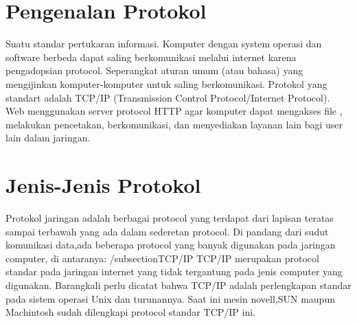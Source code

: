 

\section{Pengenalan Protokol} 
 Suatu standar pertukaran informasi. Komputer dengan system operasi dan software berbeda dapat saling berkomunikasi melalui internet 
 karena pengadopsian protocol. Seperangkat aturan umum (atau bahasa) yang mengijinkan komputer-komputer untuk saling berkomunikasi. 
 Protokol yang standart adalah TCP/IP (Transmission Control Protocol/Internet Protocol). Web menggunakan server protocol HTTP agar 
 komputer dapat mengakses file , melakukan pencetakan, berkomunikasi, dan menyediakan layanan lain bagi user lain dalam jaringan. 

\section{Jenis-Jenis Protokol}
Protokol jaringan adalah berbagai protocol yang terdapat dari lapisan  teratas sampai terbawah yang ada dalam sederetan protocol.
Di pandang dari sudut komunikasi data,ada beberapa protocol yang banyak digunakan pada jaringan computer, di antaranya:
/subsection{TCP/IP}
TCP/IP merupakan protocol standar pada jaringan internet yang tidak tergantung pada jenis computer yang digunakan. 
Barangkali perlu dicatat bahwa TCP/IP adalah perlengkapan standar pada sistem operasi Unix dan turunannya. 
Saat ini mesin novell,SUN maupun Machintosh sudah dilengkapi protocol standar TCP/IP ini.


  \subsection{} 
   
    
  \subsection{} 
    

